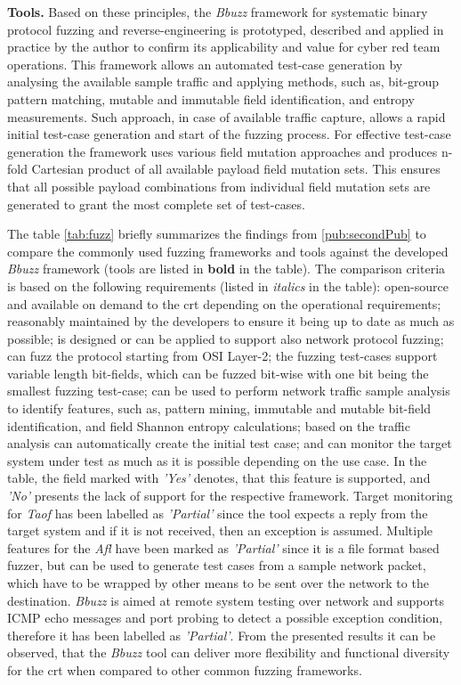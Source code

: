 \textbf{Tools.}
Based on these principles, the \textit{Bbuzz} framework for systematic binary protocol fuzzing and reverse-engineering is prototyped, described and applied in practice by the author to confirm its applicability and value for cyber red team operations.
This framework allows an automated test-case generation by analysing the available sample traffic and applying methods, such as, bit-group pattern matching, mutable and immutable field identification, and entropy measurements. Such approach, in case of available traffic capture, allows a rapid initial test-case generation and start of the fuzzing process. For effective test-case generation the framework uses various field mutation approaches and produces n-fold Cartesian product of all available payload field mutation sets. This ensures that all possible payload combinations from individual field mutation sets are generated to grant the most complete set of test-cases.

The table \ref{tab:fuzz} briefly summarizes the findings from \ref{pub:secondPub} to compare the commonly used fuzzing frameworks and tools against the developed \textit{Bbuzz} framework (tools are listed in \textbf{bold} in the table). The comparison criteria is based on the following requirements (listed in \textit{italics} in the table): open-source and available on demand to the \gls{crt} depending on the operational requirements; reasonably maintained by the developers to ensure it being up to date as much as possible; is designed or can be applied to support also network protocol fuzzing; can fuzz the protocol starting from OSI Layer-2; the fuzzing test-cases support variable length bit-fields, which can be fuzzed bit-wise with one bit being the smallest fuzzing test-case; can be used to perform network traffic sample analysis to identify features, such as, pattern mining, immutable and mutable bit-field identification, and field Shannon entropy calculations; based on the traffic analysis can automatically create the initial test case; and can monitor the target system under test as much as it is possible depending on the use case. In the table, the field marked with \textit{'Yes'} denotes, that this feature is supported, and \textit{'No'} presents the lack of support for the respective framework. Target monitoring for \textit{Taof} has been labelled as \textit{'Partial'} since the tool expects a reply from the target system and if it is not received, then an exception is assumed. Multiple features for the \textit{Afl} have been marked as \textit{'Partial'} since it is a file format based fuzzer, but can be used to generate test cases from a sample network packet, which have to be wrapped by other means to be sent over the network to the destination. \textit{Bbuzz} is aimed at remote system testing over network and supports ICMP echo messages and port probing to detect a possible exception condition, therefore it has been labelled as \textit{'Partial'}. From the presented results it can be observed, that the \textit{Bbuzz} tool can deliver more flexibility and functional diversity for the \gls{crt} when compared to other common fuzzing frameworks.

